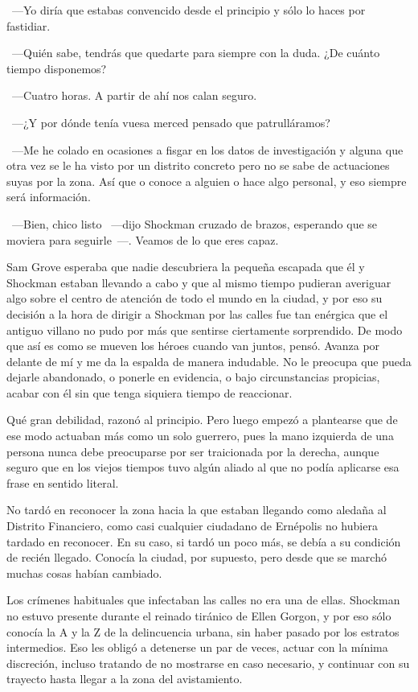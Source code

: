 ~---Yo diría que estabas convencido desde el principio y sólo lo haces por fastidiar.

~---Quién sabe, tendrás que quedarte para siempre con la duda. ¿De cuánto tiempo disponemos?

~---Cuatro horas. A partir de ahí nos calan seguro.

~---¿Y por dónde tenía vuesa merced pensado que patrulláramos?

~---Me he colado en ocasiones a fisgar en los datos de investigación y alguna que otra vez se le ha visto por un distrito concreto pero no se sabe de actuaciones suyas por la zona. Así que o conoce a alguien o hace algo personal, y eso siempre será información.

~---Bien, chico listo ~---dijo Shockman cruzado de brazos, esperando que se moviera para seguirle~---. Veamos de lo que eres capaz.

\parbreak
Sam Grove esperaba que nadie descubriera la pequeña escapada que él y Shockman estaban llevando a cabo y que al mismo tiempo pudieran averiguar algo sobre el centro de atención de todo el mundo en la ciudad, y por eso su decisión a la hora de dirigir a Shockman por las calles fue tan enérgica que el antiguo villano no pudo por más que sentirse ciertamente sorprendido. De modo que así es como se mueven los héroes cuando van juntos, pensó. Avanza por delante de mí y me da la espalda de manera indudable. No le preocupa que pueda dejarle abandonado, o ponerle en evidencia, o bajo circunstancias propicias, acabar con él sin que tenga siquiera tiempo de reaccionar.

Qué gran debilidad, razonó al principio. Pero luego empezó a plantearse que de ese modo actuaban más como un solo guerrero, pues la mano izquierda de una persona nunca debe preocuparse por ser traicionada por la derecha, aunque seguro que en los viejos tiempos tuvo algún aliado al que no podía aplicarse esa frase en sentido literal.

No tardó en reconocer la zona hacia la que estaban llegando como aledaña al Distrito Financiero, como casi cualquier ciudadano de Ernépolis no hubiera tardado en reconocer. En su caso, si tardó un poco más, se debía a su condición de recién llegado. Conocía la ciudad, por supuesto, pero desde que se marchó muchas cosas habían cambiado.

Los crímenes habituales que infectaban las calles no era una de ellas. Shockman no estuvo presente durante el reinado tiránico de Ellen Gorgon, y por eso sólo conocía la A y la Z de la delincuencia urbana, sin haber pasado por los estratos intermedios. Eso les obligó a detenerse un par de veces, actuar con la mínima discreción, incluso tratando de no mostrarse en caso necesario, y continuar con su trayecto hasta llegar a la zona del avistamiento.

